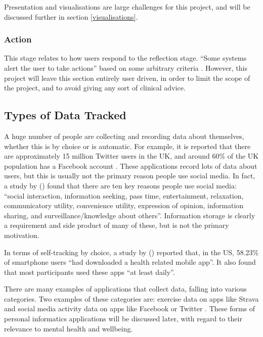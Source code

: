 \documentclass[11pt,openright,a4paper]{report}
\begin{document}
Presentation and visualisations are large challenges for this project, and will be discussed further in section \ref{visualisations}.

\subsubsection{Action}
This stage relates to how users respond to the reflection stage. \enquote{Some systems alert the user to take
actions} based on some arbitrary criteria \parencite{li2010stage}. However, this project will leave this section entirely user driven, in order to limit the scope of the project, and to avoid giving any sort of clinical advice.

\subsection{Types of Data Tracked}
A huge number of people are collecting and recording data about themselves, whether this is by choice or is automatic. For example, it is reported that there are approximately 15 million Twitter users in the UK, and around 60\% of the UK population has a Facebook account \parencite{smdemographics}. These applications record lots of data about users, but this is usually not the primary reason people use social media. In fact, a study by \citeauthor{whiting2013people} (\citeyear{whiting2013people}) found that there are ten key reasons people use social media: \enquote{social interaction, information seeking, pass time, entertainment, relaxation,
communicatory utility, convenience utility, expression of opinion, information sharing, and
surveillance/knowledge about others}. Information storage is clearly a requirement and side product of many of these, but is not the primary motivation.

In terms of self-tracking by choice, a study by \citeauthor{krebs2015health} (\citeyear{krebs2015health}) reported that, in the US, 58.23\% of smartphone users \enquote{had downloaded a health related mobile app}. It also found that most participants used these apps \enquote{at least daily}.

There are many examples of applications that collect data, falling into various categories. Two examples of these categories are: exercise data on apps like Strava \parencite{strava} and social media activity data on apps like Facebook \parencite{facebook} or Twitter \parencite{twitter}. These forms of personal informatics applications will be discussed later, with regard to their relevance to mental health and wellbeing.
\end{document}
